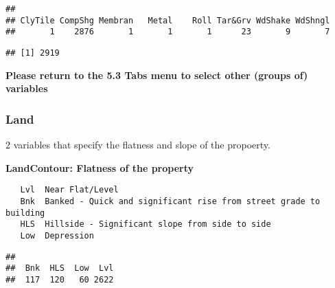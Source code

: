 \documentclass[]{article}
\newenvironment{Shaded}{\begin{snugshade}}{\end{snugshade}}
\newcommand{\KeywordTok}[1]{\textcolor[rgb]{0.13,0.29,0.53}{\textbf{#1}}}
\newcommand{\StringTok}[1]{\textcolor[rgb]{0.31,0.60,0.02}{#1}}
\newcommand{\CommentTok}[1]{\textcolor[rgb]{0.56,0.35,0.01}{\textit{#1}}}
\newcommand{\OperatorTok}[1]{\textcolor[rgb]{0.81,0.36,0.00}{\textbf{#1}}}
\newcommand{\NormalTok}[1]{#1}
\begin{document}
\begin{verbatim}
## 
## ClyTile CompShg Membran   Metal    Roll Tar&Grv WdShake WdShngl 
##       1    2876       1       1       1      23       9       7
\end{verbatim}

\begin{Shaded}
\end{Shaded}

\begin{verbatim}
## [1] 2919
\end{verbatim}

\textbf{Please return to the 5.3 Tabs menu to select other (groups of)
variables}

\subsubsection{Land}\label{land}

2 variables that specify the flatness and slope of the propoerty.

\textbf{LandContour: Flatness of the property}

\begin{verbatim}
   Lvl  Near Flat/Level 
   Bnk  Banked - Quick and significant rise from street grade to building
   HLS  Hillside - Significant slope from side to side
   Low  Depression
\end{verbatim}

\begin{Shaded}
\end{Shaded}

\begin{verbatim}
## 
##  Bnk  HLS  Low  Lvl 
##  117  120   60 2622
\end{verbatim}

\begin{Shaded}
\end{Shaded}
\end{document}
